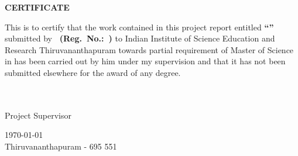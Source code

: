 \begin{center}
{\Large{\bf{CERTIFICATE}}}
\end{center}


\noindent
This is to certify that the work contained in this project report entitled
{\bf ``\ThesisTitle''} submitted by {\bf\ThesisAuthor\ (Reg.\ No.:\ \RegNumber)} to Indian Institute of Science Education and Research
Thiruvananthapuram towards partial requirement of Master of Science in
{\bf \Department} has been carried out by him under my supervision and
that it has not been submitted elsewhere for the award of any degree.

\vspace{3.5cm}

\noindent
\vspace{4cm}

\begin{flushright}
    \begin{minipage}[c]{0.4\textwidth}
    \centering
    \fillin[0.9\linewidth]\\
    {\large \bf \ProjectSupervisor} \medskip\\
    {\large Project Supervisor}
    \end{minipage}
\end{flushright}
\vfill
\noindent\today \\
Thiruvananthapuram - 695 551
\vspace{1.5cm}
\cleardoublepage
